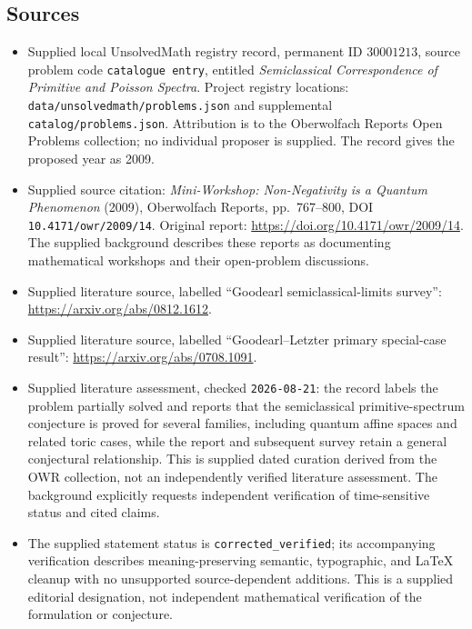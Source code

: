 \documentclass[11pt]{article}
\begin{document}
\subsection{Sources}
\begin{itemize}
\item Supplied local UnsolvedMath registry record, permanent ID \(30001213\), source problem code \texttt{catalogue entry}, entitled \emph{Semiclassical Correspondence of Primitive and Poisson Spectra}. Project registry locations: \texttt{data/unsolvedmath/problems.json} and supplemental \texttt{catalog/problems.json}. Attribution is to the Oberwolfach Reports Open Problems collection; no individual proposer is supplied. The record gives the proposed year as 2009.
\item Supplied source citation: \emph{Mini-Workshop: Non-Negativity is a Quantum Phenomenon} (2009), Oberwolfach Reports, pp.~767--800, DOI \texttt{10.4171/owr/2009/14}. Original report: \url{https://doi.org/10.4171/owr/2009/14}. The supplied background describes these reports as documenting mathematical workshops and their open-problem discussions.
\item Supplied literature source, labelled ``Goodearl semiclassical-limits survey'': \url{https://arxiv.org/abs/0812.1612}.
\item Supplied literature source, labelled ``Goodearl--Letzter primary special-case result'': \url{https://arxiv.org/abs/0708.1091}.
\item Supplied literature assessment, checked \texttt{2026-08-21}: the record labels the problem partially solved and reports that the semiclassical primitive-spectrum conjecture is proved for several families, including quantum affine spaces and related toric cases, while the report and subsequent survey retain a general conjectural relationship. This is supplied dated curation derived from the OWR collection, not an independently verified literature assessment. The background explicitly requests independent verification of time-sensitive status and cited claims.
\item The supplied statement status is \texttt{corrected\_verified}; its accompanying verification describes meaning-preserving semantic, typographic, and LaTeX cleanup with no unsupported source-dependent additions. This is a supplied editorial designation, not independent mathematical verification of the formulation or conjecture.
\end{itemize}
\end{document}
